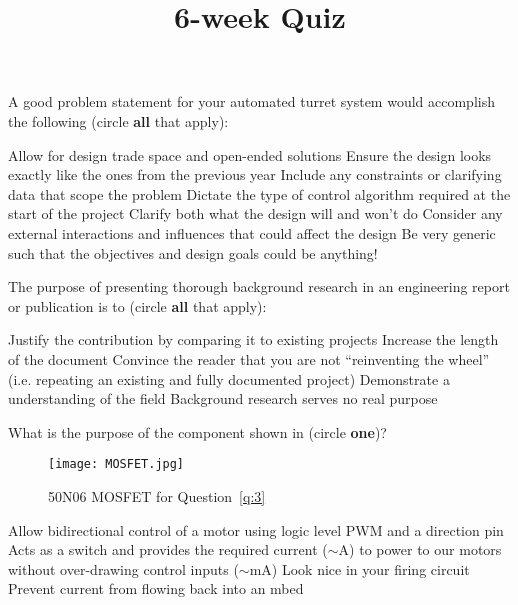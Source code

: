 \documentclass[addpoints,noanswers]{exam}
\title{6-week Quiz}
\author{\usnaInstructorShort}
\date{\printdate{2/12/2020}}
\begin{document}
\maketitle


\begin{questions}
\question[1]
A good problem statement for your automated turret system would accomplish the following (circle {\bf all} that apply):
\begin{choices}
\CorrectChoice Allow for design trade space and open-ended solutions
\choice Ensure the design looks exactly like the ones from the previous year  
\CorrectChoice Include any constraints or clarifying data that scope the problem
\choice Dictate the type of control algorithm required at the start of the project
\CorrectChoice Clarify both what the design will and won't do 
\CorrectChoice Consider any external interactions and influences that could affect the design
\choice Be very generic such that the objectives and design goals could be anything!
\end{choices}







\question[1]
The purpose of presenting thorough background research in an engineering report or publication is to (circle {\bf all} that apply):
\begin{choices}
\CorrectChoice Justify the contribution by comparing it to existing projects
\choice Increase the length of the document 
\CorrectChoice Convince the reader that you are not ``reinventing the wheel'' (i.e. repeating an existing and fully documented project)
\CorrectChoice Demonstrate a understanding of the field
\choice Background research serves no real purpose
\end{choices}










\question[1]\label{q:3}
What is the purpose of the component shown in  (circle {\bf one})?
\begin{figure}[h]
\centering
	\texttt{[image: MOSFET.jpg]}
	\caption{50N06 MOSFET for Question~\ref{q:3}}
	\label{fig:REG3ASW}
\end{figure}
\begin{choices}
\choice Allow bidirectional control of a motor using logic level PWM and a direction pin
\CorrectChoice Acts as a switch and provides the required current ($\sim\si{\ampere}$) to power to our motors without over-drawing control inputs ($\sim\si{\milli\ampere}$)
\choice Look nice in your firing circuit
\choice Prevent current from flowing back into an mbed
\end{choices}






\end{questions}
\end{document}

